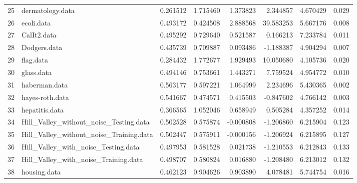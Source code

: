 \begin{table}
{\begin{tabular}{|l|l|rrrrrr|}
25 &                         dermatology.data &       0.261512 &               1.715460 &   1.373823 &    2.344857 &  4.670429 &        0.029 \\
26 &                               ecoli.data &       0.493172 &               0.424508 &   2.888568 &   39.583253 &  5.667176 &        0.008 \\
27 &                              CalIt2.data &       0.495292 &               0.729640 &   0.521587 &    0.166213 &  7.233784 &        0.011 \\
28 &                             Dodgers.data &       0.435739 &               0.709887 &   0.093486 &   -1.188387 &  4.904294 &        0.007 \\
29 &                                flag.data &       0.284432 &               1.772677 &   1.929493 &   10.050680 &  4.105736 &        0.020 \\
30 &                               glass.data &       0.494146 &               0.753661 &   1.443271 &    7.759524 &  4.954772 &        0.010 \\
31 &                            haberman.data &       0.563177 &               0.597221 &   1.064999 &    2.234696 &  5.430365 &        0.002 \\
32 &                          hayes-roth.data &       0.541667 &               0.474571 &   0.415503 &   -0.847602 &  4.766142 &        0.003 \\
33 &                           hepatitis.data &       0.366565 &               1.052046 &   0.658949 &    0.505284 &  4.357252 &        0.014 \\
34 &   Hill\_Valley\_without\_noise\_Testing.data &       0.502528 &               0.575874 &  -0.000808 &   -1.206860 &  6.215904 &        0.123 \\
35 &  Hill\_Valley\_without\_noise\_Training.data &       0.502447 &               0.575911 &  -0.000156 &   -1.206924 &  6.215895 &        0.127 \\
36 &      Hill\_Valley\_with\_noise\_Testing.data &       0.497953 &               0.581528 &   0.021738 &   -1.210553 &  6.212843 &        0.133 \\
37 &     Hill\_Valley\_with\_noise\_Training.data &       0.498707 &               0.580824 &   0.016880 &   -1.208480 &  6.213012 &        0.132 \\
38 &                             housing.data &       0.462123 &               0.904626 &   0.903890 &    4.078481 &  5.744754 &        0.016 \\

\end{tabular}}
\end{table}
